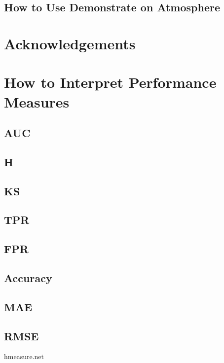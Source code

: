 \documentclass[twoside,a4paper]{refart}
\begin{document}
\subsection{How to Use Demonstrate on Atmosphere}

\section{Acknowledgements}

\section{How to Interpret Performance Measures}

\subsection{AUC}

\subsection{H}

\subsection{KS}

\subsection{TPR}

\subsection{FPR}

\subsection{Accuracy}

\subsection{MAE}

\subsection{RMSE}

hmeasure.net
\end{document}
